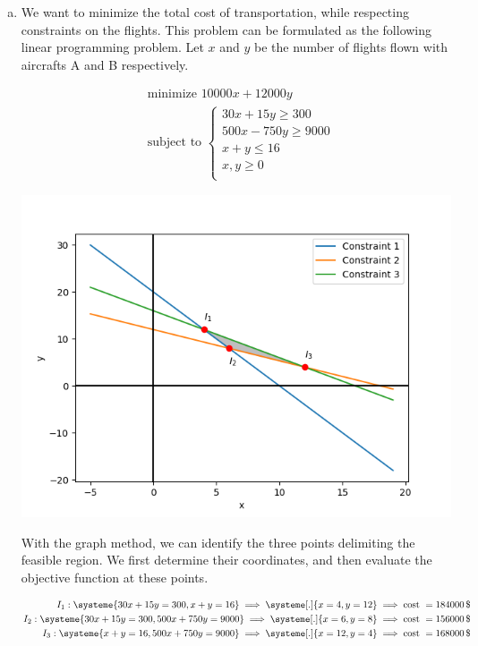 \documentclass[a4paper, 10pt, twoside]{article}
\begin{document}
\begin{enumerate}[a)]
    \item We want to minimize the total cost of transportation, while respecting constraints on the flights. This problem can be formulated as the following linear programming problem.
          Let $x$ and $y$ be the number of flights flown with aircrafts A and B respectively.

          \begin{align*}
               & \text{minimize } 10000x + 12000y \\
               & \text{subject to }
              \begin{cases}
                  30 x + 15 y \ge 300    \\
                  500 x - 750 y \ge 9000 \\
                  x + y \le 16                         \\
                  x, y \ge 0                           \\
              \end{cases}
          \end{align*}

          \begin{center}
              \includegraphics[width = .5\textwidth]{graph2.png}
          \end{center}

          With the graph method, we can identify the three points delimiting the feasible region. We first determine their coordinates, and then evaluate the objective function at these points.

          \begin{align*}
              I_1 :
              \systeme{
                  30x+15y=300,
                  x+y=16
              }
              \implies
              \systeme[.]{
                  x=4,
                  y=12
              }
              \implies \text{cost } = 184000\,\$ \\
              I_2 :
              \systeme{
                  30x+15y=300,
                  500x+750y=9000
              }
              \implies
              \systeme[.]{
                  x=6,
                  y=8
              }
              \implies \text{cost } = 156000\,\$ \\
              I_3 :
              \systeme{
                  x+y=16,
                  500x+750y=9000
              }
              \implies
              \systeme[.]{
                  x=12,
                  y=4
              }
              \implies \text{cost } = 168000\,\$ \\
          \end{align*}


\end{enumerate}
\end{document}
